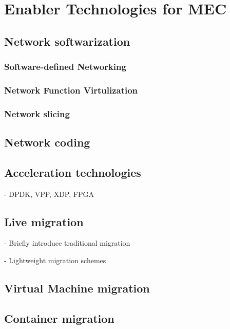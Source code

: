 \section{Enabler Technologies for MEC} \label{tech}


\subsection{Network softwarization}



\subsubsection{Software-defined Networking}

\subsubsection{Network Function Virtulization}

\subsubsection{Network slicing}


\subsection{Network coding}


\subsection{Acceleration technologies}

- DPDK, VPP, XDP, FPGA




\subsection{Live migration}

- Briefly introduce traditional migration

- Lightweight migration schemes 

\subsection{Virtual Machine migration}

\subsection{Container migration}

